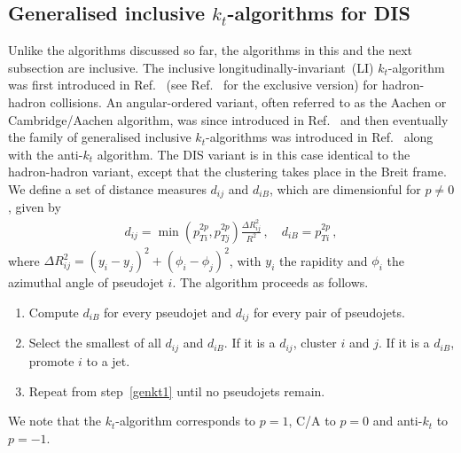 \subsection{Generalised inclusive $k_t$-algorithms for DIS}
\label{sec:gen-kt}
%
Unlike the algorithms discussed so far, the algorithms in this and the
next subsection are inclusive.
%
The inclusive longitudinally-invariant~(LI) $k_t$-algorithm was first
introduced in Ref.~\cite{Catani:1993hr} (see Ref.~\cite{Ellis:1993tq}
for the exclusive version) for hadron-hadron collisions. 
An angular-ordered variant, often referred to as the Aachen or Cambridge/Aachen algorithm,
was since introduced in Ref.~\cite{Wobisch:1998wt} and
then eventually the family of generalised inclusive $k_t$-algorithms
was introduced in Ref.~\cite{Cacciari:2008gp} along with the anti-$k_t$
algorithm.
%
The DIS variant is in this case identical to the hadron-hadron
variant, except that the clustering takes place in the Breit frame.
%
We define a set of distance measures $d_{ij}$ and $d_{iB}$, which are dimensionful for $p\neq 0$,  given by
\begin{align}
  d_{ij} = \min(p_{Ti}^{2p},p_{Tj}^{2p}) \frac{\Delta R_{ij}^2}{R^2}\,,\quad d_{iB} = p_{Ti}^{2p}\,,
\end{align}
where $\Delta R_{ij}^2 = (y_i -y_j)^2 + (\phi_i - \phi_j)^2$, with
$y_i$ the rapidity and $\phi_i$ the azimuthal angle of pseudojet
$i$. The algorithm proceeds as follows.
\begin{enumerate}
\item \label{genkt1} Compute $d_{iB}$ for every pseudojet and $d_{ij}$
  for every pair of pseudojets.
\item Select the smallest of all $d_{ij}$ and $d_{iB}$. If it is a
  $d_{ij}$, cluster $i$ and $j$. If it is a $d_{iB}$, promote $i$ to a
  jet.
\item Repeat from step~\ref{genkt1} until no pseudojets remain.
\end{enumerate}
We note that the $k_t$-algorithm corresponds to $p=1$,
C/A to $p=0$ and anti-$k_t$ to $p=-1$.

